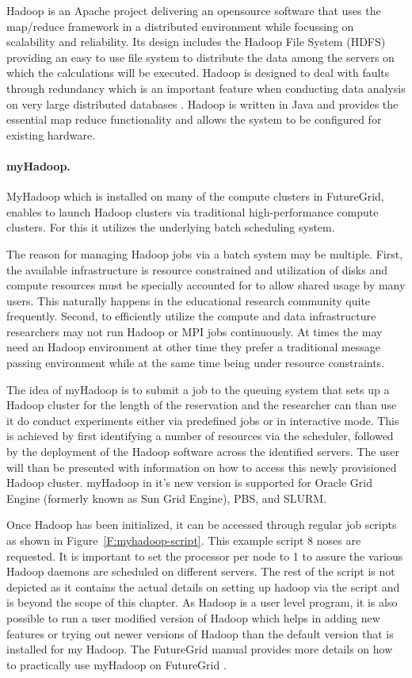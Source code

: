 Hadoop \cite{report/myhadoop}\cite{myhadoop2} is an Apache project
delivering an opensource software that uses the map/reduce framework
in a distributed environment while focussing on scalability and
reliability. Its design includes the Hadoop File System (HDFS) providing an
easy to use file system to distribute the data among the servers on
which the calculations will be executed. Hadoop is designed to deal
with faults through redundancy which is an important feature when
conducting data analysis on very large distributed databases
\cite{www/hadoop}.  Hadoop is written in Java and provides the
essential map reduce functionality and allows the system to be
configured for existing hardware.

\paragraph{myHadoop.}

MyHadoop which is installed on many of the compute clusters in
FutureGrid, enables to launch Hadoop clusters via traditional
high-performance compute clusters. For this it utilizes the underlying
batch scheduling system. 

The reason for managing Hadoop jobs via a batch system may be
multiple. First, the available infrastructure is resource constrained
and utilization of disks and compute resources must be specially
accounted for to allow shared usage by many users. This naturally
happens in the educational research community quite frequently. 
Second, to efficiently utilize the compute and data infrastructure
researchers may not run Hadoop or MPI jobs continuously. At times the
may need an Hadoop environment at other time they prefer a traditional
message passing environment while at the same time being under
resource constraints.

The idea of myHadoop is to submit a job to the queuing system that
sets up a Hadoop cluster for the length of the reservation and the
researcher can than use it do conduct experiments either via
predefined jobs or in interactive mode. This is achieved by first
identifying a number of resources via the scheduler, followed by the
deployment of the Hadoop software across the identified servers. The
user will than be presented with information on how to access this
newly provisioned Hadoop cluster. myHadoop in it's new version
\cite{myhadoop2} is supported for Oracle Grid Engine (formerly known
as Sun Grid Engine), PBS, and SLURM. 

Once Hadoop has been initialized, it can be accessed through regular
job scripts as shown in Figure~\ref{F:myhadoop-script}. This example
script 8 noses are requested. It is important to set the processor per
node to 1 to assure the various Hadoop daemons are scheduled on
different servers. The rest of the script is not depicted as it
contains the actual details on setting up hadoop via the script and is
beyond the scope of this chapter. As Hadoop is a user level program, it is also
possible to run a user modified version of Hadoop which helps in
adding new features or trying out newer versions of Hadoop than the
default version that is installed for my Hadoop. The FutureGrid manual
provides more details on how to practically use myHadoop on FutureGrid
\cite{fg-manual-hadoop}.

